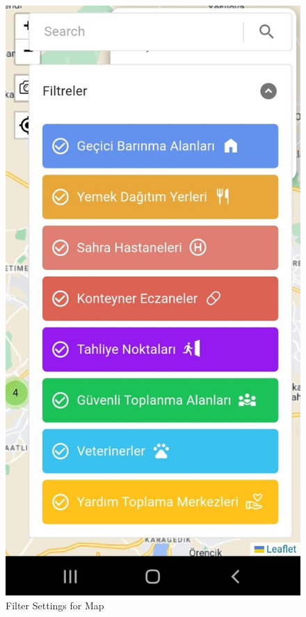 \begin{figure}[H]
    \begin{center}
        \includegraphics[scale = 0.15]{assets/filter.jpeg}
        \caption[Filter Settings for Map]{Filter Settings for Map}
    \end{center}
\end{figure}



